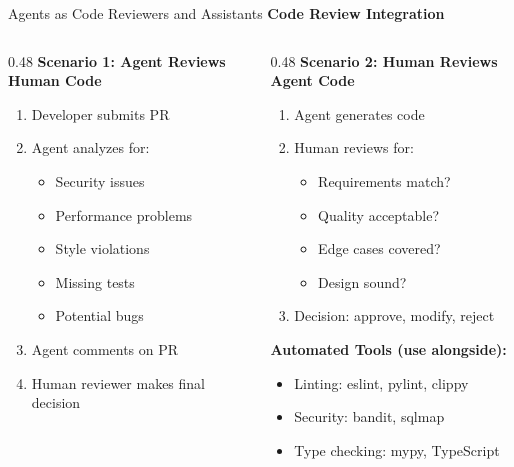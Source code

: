 \documentclass[aspectratio=169,11pt]{beamer}
\begin{document}
\begin{frame}{Agents as Code Reviewers and Assistants}
    \textbf{Code Review Integration}

    \begin{columns}[T]
        \begin{column}{0.48\textwidth}
            \textbf{Scenario 1: Agent Reviews Human Code}
            \begin{enumerate}
                \item Developer submits PR
                \item Agent analyzes for:
                \begin{itemize}
                    \item Security issues
                    \item Performance problems
                    \item Style violations
                    \item Missing tests
                    \item Potential bugs
                \end{itemize}
                \item Agent comments on PR
                \item Human reviewer makes final decision
            \end{enumerate}
        \end{column}
        \begin{column}{0.48\textwidth}
            \textbf{Scenario 2: Human Reviews Agent Code}
            \begin{enumerate}
                \item Agent generates code
                \item Human reviews for:
                \begin{itemize}
                    \item Requirements match?
                    \item Quality acceptable?
                    \item Edge cases covered?
                    \item Design sound?
                \end{itemize}
                \item Decision: approve, modify, reject
            \end{enumerate}

            \vspace{0.3cm}
            \textbf{Automated Tools (use alongside):}
            \begin{itemize}
                \item Linting: eslint, pylint, clippy
                \item Security: bandit, sqlmap
                \item Type checking: mypy, TypeScript
            \end{itemize}
        \end{column}
    \end{columns}
\end{frame}
\end{document}
